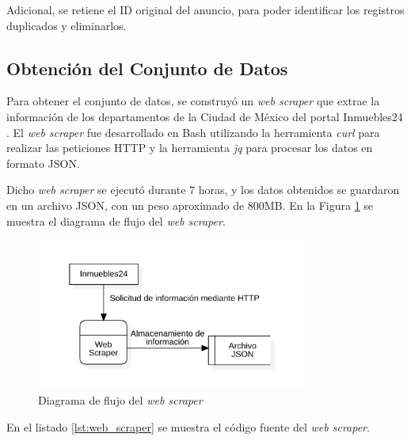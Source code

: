 Adicional, se retiene el ID original del anuncio, para poder identificar los
registros duplicados y eliminarlos.

\subsection{Obtención del Conjunto de Datos}

Para obtener el conjunto de datos, se construyó un \textit{web scraper} que
extrae la información de los departamentos de la Ciudad de México del portal
Inmuebles24 \cite{inmuebles24url}. El \textit{web scraper} fue desarrollado en
Bash utilizando la herramienta \textit{curl} para realizar las peticiones HTTP
y la herramienta \textit{jq} para procesar los datos en formato JSON.

Dicho \textit{web scraper} se ejecutó durante 7 horas, y los datos obtenidos
se guardaron en un archivo JSON, con un peso aproximado de 800MB. En la Figura
\ref{fig:web_scraper} se muestra el diagrama de flujo del \textit{web scraper}.

\begin{figure}[H]
    \centering
    \includegraphics[width=0.8\textwidth]{imagenes/04-diseno/arquitectura-web-scraper.png}
    \caption{Diagrama de flujo del \textit{web scraper}}
    \label{fig:web_scraper}
\end{figure}

En el listado \ref{lst:web_scraper} se muestra el código fuente del \textit{web
scraper}.

